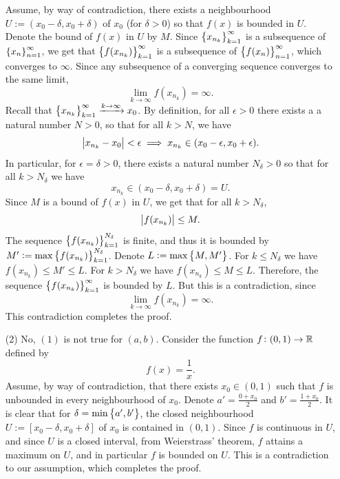 \documentclass[11pt,a4paper]{article}
\begin{document}
\begin{solution}
\begin{enumerate}
    Assume, by way of contradiction, there exists a neighbourhood
    $U := (x_0 - \delta,x_0 + \delta)$ of $x_0$ (for $\delta > 0$)
    so that $f(x)$ is bounded in $U$.
    Denote the bound of $f(x)$ in $U$ by $M$.
    Since $\set{x_{n_k}}_{k=1}^{\infty}$ is a subsequence of
    $\set{x_n}_{n=1}^{\infty}$, we get that $\set{f(x_{n_k})}_{k=1}^{\infty}$
    is a subsequence of $\set{f(x_n)}_{n=1}^{\infty}$,
    which converges to $\infty$.
    Since any subsequence of a converging sequence converges to the same limit,
    \[
      \lim_{k \to \infty} f(x_{n_k}) = \infty.
    \]
    Recall that $\set{x_{n_k}}_{k=1}^{\infty} \taking{k \to \infty} x_0$.
    By definition, for all $\epsilon > 0$ there exists a a natural
    number $N > 0$,
    so that for all $k > N$, we have
    \[
      \abs{x_{n_k} - x_0} < \epsilon \implies
      x_{n_k} \in (x_0 - \epsilon,x_0 + \epsilon).
    \]
    In particular, for $\epsilon = \delta > 0$,
    there exists a natural number
    $N_{\delta} > 0$ so that for all $k > N_{\delta}$ we have
    \[
      x_{n_k} \in (x_0 - \delta, x_0 + \delta) = U.
    \]
    Since $M$ is a bound of $f(x)$ in $U$,
    we get that for all $k > N_{\delta}$,
    \[
      \abs{f(x_{n_k})} \le M.
    \]
    The sequence $\set{f(x_{n_k})}_{k=1}^{N_{\delta}}$ is finite,
    and thus it is bounded by $M' := \max\set{f(x_{n_k})}_{k=1}^{N_{\delta}}$.
    Denote $L := \max\set{M,M'}$.
    For $k \le N_{\delta}$ we have $f(x_{n_k}) \le M' \le L$.
    For $k > N_{\delta}$ we have $f(x_{n_k}) \le M \le L$.
    Therefore, the sequence $\set{f(x_{n_k})}_{k=1}^{\infty}$ is bounded
    by $L$.
    But this is a contradiction, since
    \[
      \lim_{k \to \infty} f(x_{n_k}) = \infty.
    \]
    This contradiction completes the proof.
    \item[(2)] No, $(1)$ is not true for $(a,b)$.
      Consider the function $f \colon (0,1) \to \mathbb{R}$ defined by
      \[
        f(x) = \frac{1}{x}.
      \]
      Assume, by way of contradiction,
      that there exists $x_0 \in (0,1)$ such that $f$
      is unbounded in every neighbourhood of $x_0$.
      Denote $a' = \frac{0 + x_0}{2}$ and $b' = \frac{1 + x_0}{2}$.
      It is clear that for $\delta = \min\left\{a',b'\right\}$,
      the closed neighbourhood $U:=[x_0 - \delta,x_0 + \delta]$ of $x_0$
      is contained in $(0,1)$.
      Since $f$ is continuous in $U$,
      and since $U$ is a closed interval,
      from Weierstrass' theorem, $f$ attains a maximum on $U$,
      and in particular $f$ is bounded on $U$.
      This is a contradiction to our assumption,
      which completes the proof.
  \end{enumerate}
\end{solution}
\end{document}
